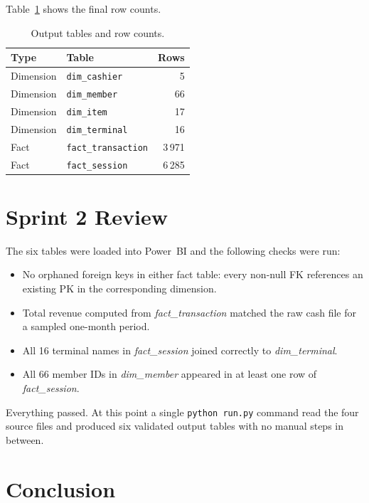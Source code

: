\documentclass[12pt, a4paper]{report}
\begin{document}
Table~\ref{tab:output_tables} shows the final row counts.

\begin{table}[H]
  \centering
  \caption{Output tables and row counts.\label{tab:output_tables}}
  \begin{tabular}{llr}
    \toprule
    \textbf{Type} & \textbf{Table} & \textbf{Rows} \\
    \midrule
    Dimension & \texttt{dim\_cashier}      &      5 \\
    Dimension & \texttt{dim\_member}       &     66 \\
    Dimension & \texttt{dim\_item}         &     17 \\
    Dimension & \texttt{dim\_terminal}     &     16 \\
    Fact      & \texttt{fact\_transaction} &  3\,971 \\
    Fact      & \texttt{fact\_session}     &  6\,285 \\
    \bottomrule
  \end{tabular}
\end{table}

\section{Sprint 2 Review}

The six tables were loaded into Power~BI and the following checks were run:

\begin{itemize}[noitemsep]
  \item No orphaned foreign keys in either fact table: every non-null FK references
        an existing PK in the corresponding dimension.
  \item Total revenue computed from \textit{fact\_transaction} matched the raw cash
        file for a sampled one-month period.
  \item All 16 terminal names in \textit{fact\_session} joined correctly to
        \textit{dim\_terminal}.
  \item All 66 member IDs in \textit{dim\_member} appeared in at least one row of
        \textit{fact\_session}.
\end{itemize}

Everything passed. At this point a single \texttt{python run.py} command read the
four source files and produced six validated output tables with no manual steps in
between.

\section{Conclusion}
\end{document}
